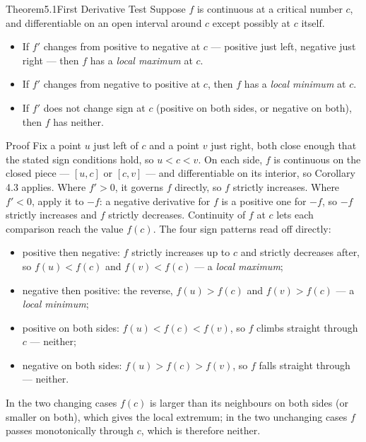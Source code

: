 \documentclass[a4paper,12pt,oneside]{memoir}
\begin{document}
\begin{envtheorem}{Theorem}{5.1}{First Derivative Test}
Suppose \(f\) is continuous at a critical number \(c\), and differentiable on an open interval around \(c\) except possibly at \(c\) itself.

\begin{itemize}
  \item If \(f'\) changes from positive to negative at \(c\) — positive just left, negative just right — then \(f\) has a \emph{local maximum} at \(c\).
  \item If \(f'\) changes from negative to positive at \(c\), then \(f\) has a \emph{local minimum} at \(c\).
  \item If \(f'\) does not change sign at \(c\) (positive on both sides, or negative on both), then \(f\) has neither.
\end{itemize}
\end{envtheorem}
\begin{envproof}{Proof}{}{}
Fix a point \(u\) just left of \(c\) and a point \(v\) just right, both close enough that the stated sign conditions hold, so \(u < c < v\). On each side, \(f\) is continuous on the closed piece — \([u, c]\) or \([c, v]\) — and differentiable on its interior, so Corollary 4.3 applies. Where \(f' > 0\), it governs \(f\) directly, so \(f\) strictly increases. Where \(f' < 0\), apply it to \(-f\): a negative derivative for \(f\) is a positive one for \(-f\), so \(-f\) strictly increases and \(f\) strictly decreases. Continuity of \(f\) at \(c\) lets each comparison reach the value \(f(c)\). The four sign patterns read off directly:

\begin{itemize}
  \item positive then negative: \(f\) strictly increases up to \(c\) and strictly decreases after, so \(f(u) < f(c)\) and \(f(v) < f(c)\) — a \emph{local maximum};
  \item negative then positive: the reverse, \(f(u) > f(c)\) and \(f(v) > f(c)\) — a \emph{local minimum};
  \item positive on both sides: \(f(u) < f(c) < f(v)\), so \(f\) climbs straight through \(c\) — neither;
  \item negative on both sides: \(f(u) > f(c) > f(v)\), so \(f\) falls straight through — neither.
\end{itemize}
In the two changing cases \(f(c)\) is larger than its neighbours on both sides (or smaller on both), which gives the local extremum; in the two unchanging cases \(f\) passes monotonically through \(c\), which is therefore neither. \qedmark
\end{envproof}
\end{document}
